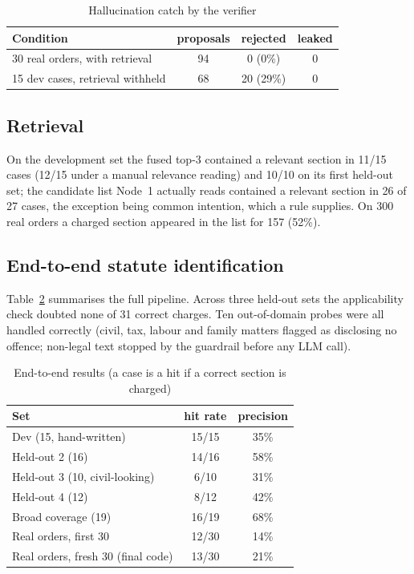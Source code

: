 \documentclass[conference]{IEEEtran}
\begin{document}
\begin{table}[t]
\caption{Hallucination catch by the verifier}
\label{tab:catch}
\centering
\begin{tabular}{lccc}
\toprule
Condition & proposals & rejected & leaked\\
\midrule
30 real orders, with retrieval & 94 & 0 (0\%) & 0\\
15 dev cases, retrieval withheld & 68 & 20 (29\%) & 0\\
\bottomrule
\end{tabular}
\end{table}

\subsection{Retrieval}
On the development set the fused top-3 contained a relevant section in 11/15 cases (12/15 under a manual relevance reading) and 10/10 on its first held-out set; the candidate list Node~1 actually reads contained a relevant section in 26 of 27 cases, the exception being common intention, which a rule supplies. On 300 real orders a charged section appeared in the list for 157 (52\%).

\subsection{End-to-end statute identification}
Table~\ref{tab:e2e} summarises the full pipeline. Across three held-out sets the applicability check doubted none of 31 correct charges. Ten out-of-domain probes were all handled correctly (civil, tax, labour and family matters flagged as disclosing no offence; non-legal text stopped by the guardrail before any LLM call).

\begin{table}[t]
\caption{End-to-end results (a case is a hit if a correct section is charged)}
\label{tab:e2e}
\centering
\begin{tabular}{lcc}
\toprule
Set & hit rate & precision\\
\midrule
Dev (15, hand-written) & 15/15 & 35\%\\
Held-out 2 (16) & 14/16 & 58\%\\
Held-out 3 (10, civil-looking) & 6/10 & 31\%\\
Held-out 4 (12) & 8/12 & 42\%\\
Broad coverage (19) & 16/19 & 68\%\\
Real orders, first 30 & 12/30 & 14\%\\
Real orders, fresh 30 (final code) & 13/30 & 21\%\\
\bottomrule
\end{tabular}
\end{table}
\end{document}
